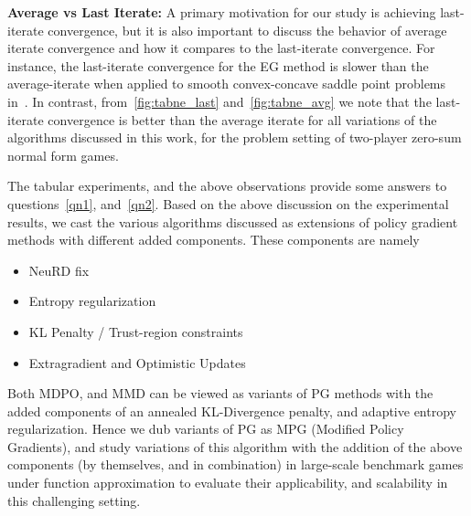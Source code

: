 \textbf{Average vs Last Iterate:}
A primary motivation for our study is achieving last-iterate convergence, but it is also important
to discuss the behavior of average iterate convergence and how it compares to the last-iterate
convergence.
For instance, the last-iterate convergence for the EG method is slower than the average-iterate
when applied to smooth convex-concave saddle point problems in~\cite{golowichLast2020}.
In contrast, from~\ref{fig:tabne_last} and~\ref{fig:tabne_avg} we note that the last-iterate
convergence is better than the average iterate for all variations of the algorithms discussed in
this work, for the problem setting of two-player zero-sum normal form games.

The tabular experiments, and the above observations provide some answers to questions~\ref{qn1},
and~\ref{qn2}.
Based on the above discussion on the experimental results, we cast the various algorithms discussed
as extensions of policy gradient methods with different added components.
These components are namely
\begin{itemize}
	\item NeuRD fix
	\item Entropy regularization
	\item KL
	      Penalty / Trust-region constraints
	\item Extragradient and Optimistic Updates
\end{itemize}

Both MDPO, and MMD can be viewed as variants of PG methods with the added
components of an annealed KL-Divergence penalty, and adaptive entropy regularization.
Hence we dub variants of PG as MPG (Modified Policy Gradients), and study variations of this
algorithm with the addition of the above components (by themselves, and in combination) in
large-scale benchmark games under function approximation to evaluate their applicability, and
scalability in this challenging setting.
